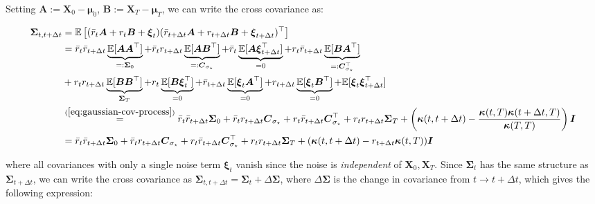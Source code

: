 \documentclass{article}
\begin{document}
Setting $\boldsymbol{A}:=\boldsymbol{X}_0-\boldsymbol{\mu}_0$, $\boldsymbol{B}:=\boldsymbol{X}_T-\boldsymbol{\mu}_T$, we can write the cross covariance as:
\begin{small}
\begin{align}
    \boldsymbol{\Sigma}_{t, t+\Delta t}&=\mathbb{E}\left[(\bar{r}_t\boldsymbol{A}+r_t\boldsymbol{B}+\boldsymbol{\xi}_t)( \bar{r}_{t+\Delta t}\boldsymbol{A}+r_{t+\Delta t}\boldsymbol{B}+\boldsymbol{\xi}_{t+\Delta t})^\top\right]\nonumber\\
    &=\bar{r}_t\bar{r}_{t+\Delta t}\underbrace{\mathbb{E}[\boldsymbol{A}\boldsymbol{A}^\top]}_{=:\boldsymbol{\Sigma}_0}+\bar{r}_tr_{t+\Delta t}\underbrace{\mathbb{E}[\boldsymbol{A}\boldsymbol{B}^\top]}_{=:\boldsymbol{C}_{\sigma_\star}}+\bar{r}_t\underbrace{\mathbb{E}[\boldsymbol{A}\boldsymbol{\xi}_{t+\Delta t}^\top]}_{=0}+r_t\bar{r}_{t+\Delta t}\underbrace{\mathbb{E}[\boldsymbol{B}\boldsymbol{A}^\top]}_{=:\boldsymbol{C}^\top_{\sigma_\star}}\nonumber\\
    &+r_tr_{t+\Delta t}\underbrace{\mathbb{E}[\boldsymbol{B}\boldsymbol{B}^\top]}_{\boldsymbol{\Sigma}_T}+r_t\underbrace{\mathbb{E}[\boldsymbol{B}\boldsymbol{\xi}_t^\top]}_{=0}+\bar{r}_{t+\Delta t}\underbrace{\mathbb{E}[\boldsymbol{\xi}_t\boldsymbol{A}^\top]}_{=0}+r_{t+\Delta t}\underbrace{\mathbb{E}[\boldsymbol{\xi}_t\boldsymbol{B}^\top]}_{=0}+\mathbb{E}[\boldsymbol{\xi}_t\boldsymbol{\xi}_{t+\Delta t}^\top]\nonumber\\
    &\overset{(\ref{eq:gaussian-cov-process})}{=}\bar{r}_t\bar{r}_{t+\Delta t}\boldsymbol{\Sigma}_0+\bar{r}_tr_{t+\Delta t}\boldsymbol{C}_{\sigma_\star}+r_t\bar{r}_{t+\Delta t}\boldsymbol{C}^\top_{\sigma_\star}+r_tr_{t+\Delta t}\boldsymbol{\Sigma}_T+\left(\boldsymbol{\kappa}(t,t+\Delta t)-\frac{\boldsymbol{\kappa}(t,T)\boldsymbol{\kappa}(t+\Delta t,T)}{\boldsymbol{\kappa}(T,T)}\right)\boldsymbol{I}\nonumber\\
    &=\bar{r}_t\bar{r}_{t+\Delta t}\boldsymbol{\Sigma}_0+\bar{r}_tr_{t+\Delta t}\boldsymbol{C}_{\sigma_\star}+r_t\bar{r}_{t+\Delta t}\boldsymbol{C}^\top_{\sigma_\star}+r_tr_{t+\Delta t}\boldsymbol{\Sigma}_T+(\boldsymbol{\kappa}(t,t+\Delta t)-r_{t+\Delta t}\boldsymbol{\kappa}(t,T))\boldsymbol{I}
\end{align}
\end{small}
where all covariances with only a single noise term $\boldsymbol{\xi}_t$ vanish since the noise is \textit{independent} of $\boldsymbol{X}_0, \boldsymbol{X}_T$. Since $\boldsymbol{\Sigma}_t$ has the same structure as $\boldsymbol{\Sigma}_{t+\Delta t}$, we can write the cross covariance as $\boldsymbol{\Sigma}_{t, t+\Delta t}=\boldsymbol{\Sigma}_t+\Delta \boldsymbol{\Sigma}$, where $\Delta\boldsymbol{\Sigma}$ is the change in covariance from $t\to t+\Delta t$, which gives the following expression: 
\end{document}
